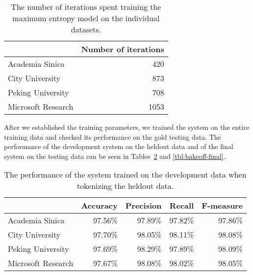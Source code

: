 \begin{table}
  \begin{center}
    \begin{tabular}{ | l | r | }
      \hline
      & Number of iterations \\ \hline
      Academia Sinica & 420 \\ \hline
      City University & 873 \\ \hline
      Peking University & 708 \\ \hline
      Microsoft Research & 1053 \\
      \hline
    \end{tabular}
  \end{center}
  \caption[Number of training iterations for Chinese segmentation]
    {The number of iterations spent training the maximum entropy model on the
    individual datasets.}
  \label{tbl:bakeoff-iters}
\end{table}

After we established the training parameters, we trained the system on the
entire training data and checked its performance on the gold testing data. The
performance of the development system on the heldout data and of the final
system on the testing data can be seen in Tables~\ref{tbl:bakeoff-devel} and
\ref{tbl:bakeoff-final}.

\begin{table}
  \begin{center}
    \begin{tabular}{ | l | r | r | r | r | }
      \hline
      & Accuracy & Precision & Recall & F-measure \\ \hline
      Academia Sinica & 97.56\% & 97.89\% & 97.82\% & 97.86\% \\ \hline
      City University & 97.70\% & 98.05\% & 98.11\% & 98.08\% \\ \hline
      Peking University & 97.69\% & 98.29\% & 97.89\% & 98.09\% \\ \hline
      Microsoft Research & 97.67\% & 98.08\% & 98.02\% & 98.05\% \\
      \hline
    \end{tabular}
  \end{center}
  \caption[Development performance of Chinese segmenter]
    {The performance of the system trained on the development data when
     tokenizing the heldout data.}
  \label{tbl:bakeoff-devel}
\end{table}


